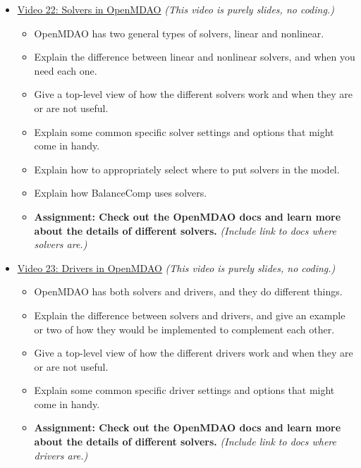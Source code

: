 \documentclass[12pt, letterpaper]{article}
\begin{document}
\begin{itemize}
	\item \underline{Video 22: Solvers in OpenMDAO} \textit{(This video is purely slides, no coding.)}
		\begin{itemize}
			\item OpenMDAO has two general types of solvers, linear and nonlinear.
			\item Explain the difference between linear and nonlinear solvers, and when you need each one. 
			\item Give a top-level view of how the different solvers work and when they are or are not useful.
			\item Explain some common specific solver settings and options that might come in handy.
			\item Explain how to appropriately select where to put solvers in the model.
			\item Explain how BalanceComp uses solvers. 
			\item \textbf{Assignment: Check out the OpenMDAO docs and learn more about the details of different solvers.} \textit{(Include link to docs where solvers are.)}
		\end{itemize}
		
	\item \underline{Video 23: Drivers in OpenMDAO} \textit{(This video is purely slides, no coding.)}
		\begin{itemize}
			\item OpenMDAO has both solvers and drivers, and they do different things.
			\item Explain the difference between solvers and drivers, and give an example or two of how they would be implemented to complement each other.
			\item Give a top-level view of how the different drivers work and when they are or are not useful.
			\item Explain some common specific driver settings and options that might come in handy.
			\item \textbf{Assignment: Check out the OpenMDAO docs and learn more about the details of different solvers.} \textit{(Include link to docs where drivers are.)}
		\end{itemize}


\end{itemize}
\end{document}
